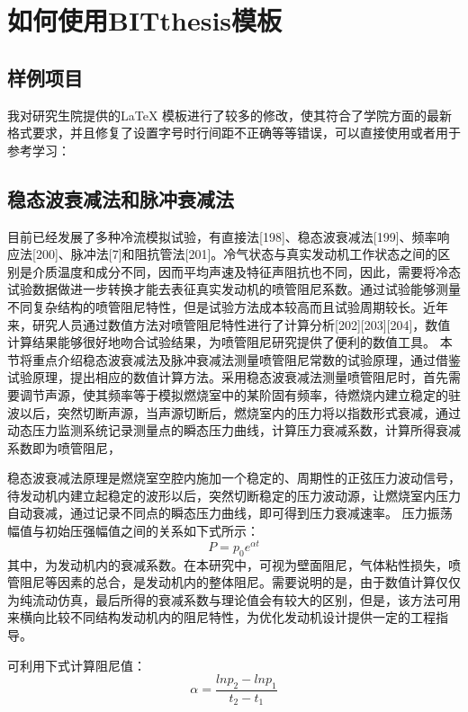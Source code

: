\chapter{如何使用BITthesis模板}
\section{样例项目}
我对研究生院提供的LaTeX 模板进行了较多的修改，使其符合了学院方面的最新格式要求，并且修复了设置字号时行间距不正确等等错误，可以直接使用或者用于参考学习：

\section{稳态波衰减法和脉冲衰减法}
目前已经发展了多种冷流模拟试验，有直接法[198]、稳态波衰减法[199]、频率响应法[200]、脉冲法[7]和阻抗管法[201]。冷气状态与真实发动机工作状态之间的区别是介质温度和成分不同，因而平均声速及特征声阻抗也不同，因此，需要将冷态试验数据做进一步转换才能去表征真实发动机的喷管阻尼系数。通过试验能够测量不同复杂结构的喷管阻尼特性，但是试验方法成本较高而且试验周期较长。近年来，研究人员通过数值方法对喷管阻尼特性进行了计算分析[202][203][204]，数值计算结果能够很好地吻合试验结果，为喷管阻尼研究提供了便利的数值工具。
本节将重点介绍稳态波衰减法及脉冲衰减法测量喷管阻尼常数的试验原理，通过借鉴试验原理，提出相应的数值计算方法。采用稳态波衰减法测量喷管阻尼时，首先需要调节声源，使其频率等于模拟燃烧室中的某阶固有频率，待燃烧内建立稳定的驻波以后，突然切断声源，当声源切断后，燃烧室内的压力将以指数形式衰减，通过动态压力监测系统记录测量点的瞬态压力曲线，计算压力衰减系数，计算所得衰减系数即为喷管阻尼，

稳态波衰减法原理是燃烧室空腔内施加一个稳定的、周期性的正弦压力波动信号，待发动机内建立起稳定的波形以后，突然切断稳定的压力波动源，让燃烧室内压力自动衰减，通过记录不同点的瞬态压力曲线，即可得到压力衰减速率。
压力振荡幅值与初始压强幅值之间的关系如下式所示：
\begin{equation}
P=p_0 e^{\alpha t}\label{eq:yaqiang}
\end{equation}
其中，为发动机内的衰减系数。在本研究中，可视为壁面阻尼，气体粘性损失，喷管阻尼等因素的总合，是发动机内的整体阻尼。需要说明的是，由于数值计算仅仅为纯流动仿真，最后所得的衰减系数与理论值会有较大的区别，但是，该方法可用来横向比较不同结构发动机内的阻尼特性，为优化发动机设计提供一定的工程指导。

可利用下式计算阻尼值：
\begin{equation}
\alpha=\dfrac{lnp_2-lnp_1}{t_2-t_1}\label{eq:zuning}
\end{equation}
